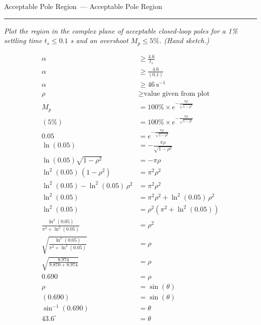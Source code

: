 \documentclass[11pt,letterpaper]{article}
\newcommand{\problem}[2]{%
  \bigskip
  \noindent{\large\bfseries Problem #1}%
  \ifx\relax#2\relax\else\ {\large --- #2}\fi
  \par\nobreak\vspace{2pt}\hrule\vspace{8pt}\nobreak
}
\newcommand{\prompt}[1]{%
  \noindent\textit{#1}\par\vspace{6pt}%
}
\begin{document}
\clearpage
\problem{4.29(c)}{Acceptable Pole Region}
\prompt{Plot the region in the complex plane of acceptable closed-loop poles for a 1\% settling time $t_s \le 0.1$ s and an overshoot $M_p \le 5\%$. (Hand sketch.)}
\begin{align}
  \alpha &\ge \frac{4.6}{t_s} \label{eq:429c-alpha} \\
  \alpha &\ge \frac{4.6}{(0.1)} \label{eq:429c-alpha-sub} \\
  \alpha &\ge 46\ \text{s}^{-1} \label{eq:429c-alpha-val} \\
  \rho &\ge \text{value given from plot} \label{eq:429c-rho} \\
  M_p &= 100\% \times e^{-\frac{\pi\rho}{\sqrt{1 - \rho^2}}} \label{eq:429c-Mp} \\
  (5\%) &= 100\% \times e^{-\frac{\pi\rho}{\sqrt{1 - \rho^2}}} \label{eq:429c-Mp-sub} \\
  0.05 &= e^{-\frac{\pi\rho}{\sqrt{1 - \rho^2}}} \label{eq:429c-Mp-frac} \\
  \ln(0.05) &= -\frac{\pi\rho}{\sqrt{1 - \rho^2}} \label{eq:429c-Mp-ln} \\
  \ln(0.05)\sqrt{1 - \rho^2} &= -\pi\rho \label{eq:429c-Mp-mult} \\
  \ln^2(0.05)\,(1 - \rho^2) &= \pi^2\rho^2 \label{eq:429c-Mp-sq} \\
  \ln^2(0.05) - \ln^2(0.05)\,\rho^2 &= \pi^2\rho^2 \label{eq:429c-Mp-dist} \\
  \ln^2(0.05) &= \pi^2\rho^2 + \ln^2(0.05)\,\rho^2 \label{eq:429c-Mp-add} \\
  \ln^2(0.05) &= \rho^2\left(\pi^2 + \ln^2(0.05)\right) \label{eq:429c-Mp-factor} \\
  \frac{\ln^2(0.05)}{\pi^2 + \ln^2(0.05)} &= \rho^2 \label{eq:429c-Mp-div} \\
  \sqrt{\frac{\ln^2(0.05)}{\pi^2 + \ln^2(0.05)}} &= \rho \label{eq:429c-Mp-sqrt} \\
  \sqrt{\frac{8.974}{9.870 + 8.974}} &= \rho \label{eq:429c-Mp-vals} \\
  0.690 &= \rho \label{eq:429c-rho-val} \\
  \rho &= \sin(\theta) \label{eq:429c-rho-sin} \\
  (0.690) &= \sin(\theta) \label{eq:429c-rho-sin-sub} \\
  \sin^{-1}(0.690) &= \theta \label{eq:429c-theta-asin} \\
  43.6^\circ &= \theta \label{eq:429c-theta-val}
\end{align}
\end{document}

